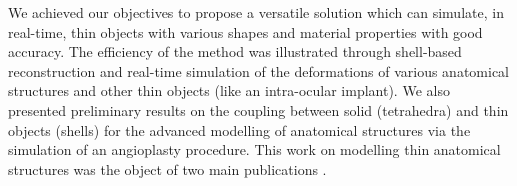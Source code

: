 We achieved our objectives to propose a versatile solution which can simulate, in real-time, thin objects with various shapes and material properties with good accuracy. The efficiency of the method was illustrated through shell-based reconstruction and real-time simulation of the deformations of various anatomical structures and other thin objects (like an intra-ocular implant). We also presented preliminary results on the coupling between solid (tetrahedra) and thin objects (shells) for the advanced modelling of anatomical structures via the simulation of an angioplasty procedure. This work on modelling thin anatomical structures was the object of two main publications \citep{Comas2010a,Comas2010b}.
